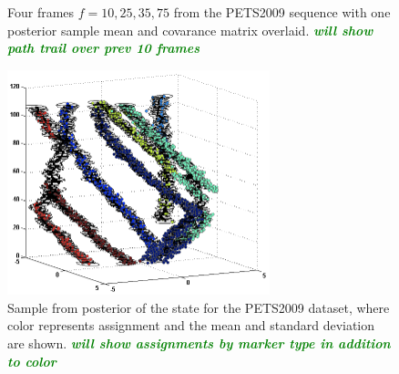 \documentclass[smallcondensed, final]{svjour3}
\newcommand{\willie}[1]{\textcolor{green}{\textsf{\emph{\textbf{\textcolor{green}{#1}}}}}}
\begin{document}
\begin{figure}
  \centering             
  \caption{Four frames $f=10, 25, 35, 75$ from the PETS2009 sequence with one posterior sample mean and covarance matrix overlaid. \willie{will show path trail over prev 10 frames}}
  \label{fig:pets2009_imgs}
\end{figure}


\begin{figure}
	\centering
	\includegraphics[width=3in]{../img/pets2009_results}
	\caption{Sample from posterior of the state for the PETS2009 dataset, where color represents assignment and the mean and standard deviation are shown. \willie{will show assignments by marker type in addition to color}}
	\label{fig:pets2009_results}
\end{figure}
\end{document}
